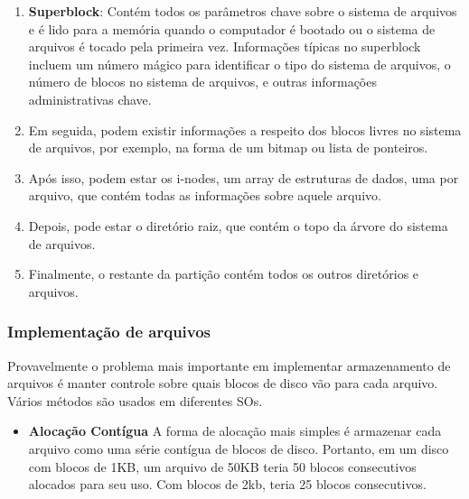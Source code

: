 \documentclass[10pt]{article}
\begin{document}
\begin{enumerate}
    \item \textbf{Superblock}: Contém todos os parâmetros chave sobre o sistema de arquivos
    e é lido para a memória quando o computador é bootado ou o sistema de arquivos é tocado
    pela primeira vez. Informações típicas no superblock incluem um número mágico para 
    identificar o tipo do sistema de arquivos, o número de blocos no sistema de 
    arquivos, e outras informações administrativas chave.
    \item Em seguida, podem existir informações a respeito dos blocos livres no sistema
    de arquivos, por exemplo, na forma de um bitmap ou lista de ponteiros. 
    \item Após isso, podem estar os i-nodes, um array de estruturas de dados, uma por arquivo,
    que contém todas as informações sobre aquele arquivo.
    \item Depois, pode estar o diretório raiz, que contém o topo da árvore do sistema de arquivos.
    \item Finalmente, o restante da partição contém todos os outros diretórios e arquivos.
\end{enumerate}

\subsubsection{Implementação de arquivos}

Provavelmente o problema mais importante em implementar armazenamento de arquivos é manter
controle sobre quais blocos de disco vão para cada arquivo. Vários métodos são usados em 
diferentes SOs.

\begin{itemize}
    \item \textbf{Alocação Contígua}
    A forma de alocação mais simples é armazenar cada arquivo como uma série
    contígua de blocos de disco. Portanto, em um disco com blocos de 1KB, um arquivo de 
    50KB teria 50 blocos consecutivos alocados para seu uso. Com blocos de 2kb, teria 
    25 blocos consecutivos.

\end{itemize}
\end{document}
